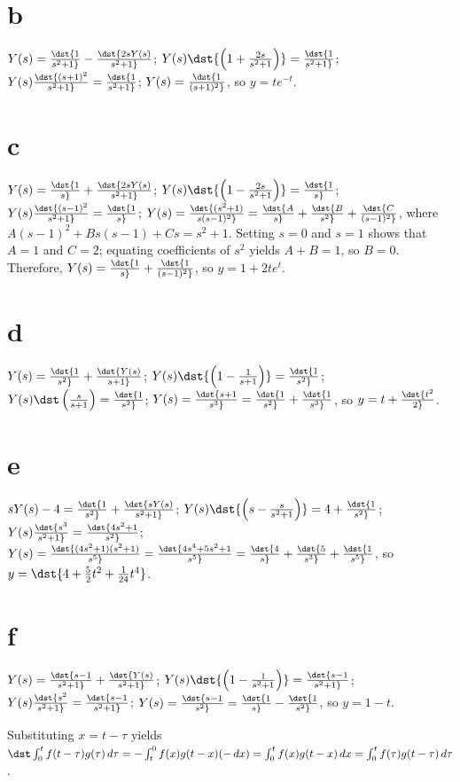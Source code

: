 \documentclass[dvips]{book}
\renewcommand{\exer}[1]{\par\medskip\;\noindent{\color{red}\bf #1.}}
\numberwithin{example}{section}
\numberwithin{equation}{section}
\numberwithin{theorem}{section}
\numberwithin{table}{section}
\numberwithin{figure}{section}
\begin{document}
\part{b}
$Y(s)=\dst{1\over s^2+1}-\dst{2sY(s)\over s^2+1}$;
$Y(s)\dst{\left(1+{2s\over
s^2+1}\right)}=\dst{1\over s^2+1}$; $Y(s)\dst{(s+1)^2\over
s^2+1}=\dst{1\over s^2+1}$; $Y(s)=\dst{1\over(s+1)^2}$, so
$y=te^{-t}$.

\part{c}
$Y(s)=\dst{1\over s}+\dst{2sY(s)\over s^2+1}$;
$Y(s)\dst{\left(1-{2s\over
s^2+1}\right)}=\dst{1\over s}$; $Y(s)\dst{(s-1)^2\over
s^2+1}=\dst{1\over s}$;
$Y(s)=\dst{(s^2+1)\over s(s-1)^2}=\dst{A\over s}+\dst{B\over s^2}
+\dst{C\over(s-1)^2}$, where $A(s-1)^2+Bs(s-1)+Cs=s^2+1$.
Setting $s=0$ and $s=1$ shows that $A=1$ and $C=2$; equating
coefficients of $s^2$ yields $A+B=1$, so $B=0$.  Therefore,
$Y(s)=\dst{1\over s}
+\dst{1\over(s-1)^2}$, so $y=1+2te^t$.

\part{d}
$Y(s)=\dst{1\over s^2}+\dst{Y(s)\over s+1}$;
$Y(s)\dst{\left(1-{1\over s+1}\right)}=\dst{1\over s^2}$;
$Y(s)\dst\left(s\over s+1\right)=\dst{1\over s^2}$;
$Y(s)=\dst{s+1\over s^3}
=\dst{1\over s^2}+\dst{1\over s^3}$, so
$y=t+\dst{t^2\over 2}$.

\part{e}
$sY(s)-4=\dst{1\over s^2}+\dst{sY(s)\over s^2+1}$;
$Y(s)\dst{\left(s-{s\over
s^2+1}\right)}=4+\dst{1\over s^2}$; $Y(s)\dst{s^3\over
s^2+1}=\dst{4s^2+1\over s^2}$;
$Y(s)=\dst{(4s^2+1)(s^2+1)\over s^5}=\dst{4s^4+5s^2+1\over s^5}
=\dst{4\over s}+\dst{5\over s^3}+\dst{1\over s^5}$, so
$y=\dst{4+{5\over 2}t^2+{1\over
24}t^4}$.

\part{f}
$Y(s)=\dst{s-1\over s^2+1}+\dst{Y(s)\over s^2+1}$;
$Y(s)\dst{\left(1-{1\over
s^2+1}\right)}=\dst{s-1\over s^2+1}$; $Y(s)\dst{s^2\over
s^2+1}=\dst{s-1\over s^2+1}$; $Y(s)=\dst{s-1\over s^2}
=\dst{1\over s}-\dst{1\over s^2}$, so
 $y=1-t$.


\exer{8.6.6} Substituting $x=t-\tau$ yields
$\dst\int_0^tf(t-\tau)g(\tau)\,d\tau=-\int_t^0f(x)g(t-x)(-\,dx)=
\int_0^tf(x)g(t-x)\,dx=\int_0^tf(\tau)g(t-\tau)\,d\tau$.
\end{document}
